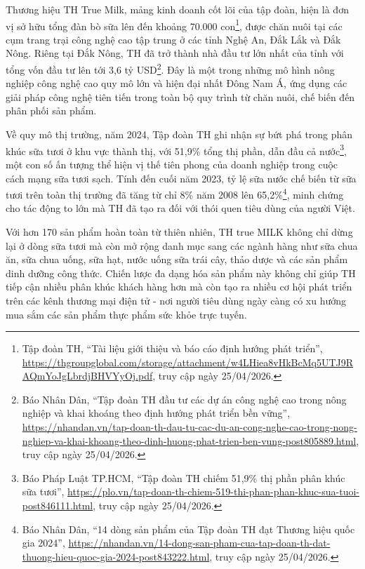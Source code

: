 Thương hiệu TH True Milk, mảng kinh doanh cốt lõi của tập đoàn, hiện là
đơn vị sở hữu tổng đàn bò sữa lên đến khoảng 70.000 con\footnote{Tập
  đoàn TH, ``Tài liệu giới thiệu và báo cáo định hướng phát triển'',
  \url{https://thgroupglobal.com/storage/attachment/w4LHiea8vHkBcMq5UTJ9RAQmYoJgLbrdjBHVYyOj.pdf},
  truy cập ngày 25/04/2026.}, được chăn nuôi tại các cụm trang trại công
nghệ cao tập trung ở các tỉnh Nghệ An, Đắk Lắk và Đắk Nông. Riêng tại
Đắk Nông, TH đã trở thành nhà đầu tư lớn nhất của tỉnh với tổng vốn đầu
tư lên tới 3,6 tỷ USD\footnote{Báo Nhân Dân, ``Tập đoàn TH đầu tư các dự
  án công nghệ cao trong nông nghiệp và khai khoáng theo định hướng phát
  triển bền vững'',
  \url{https://nhandan.vn/tap-doan-th-dau-tu-cac-du-an-cong-nghe-cao-trong-nong-nghiep-va-khai-khoang-theo-dinh-huong-phat-trien-ben-vung-post805889.html},
  truy cập ngày 25/04/2026.}. Đây là một trong những mô hình nông nghiệp
công nghệ cao quy mô lớn và hiện đại nhất Đông Nam Á, ứng dụng các giải
pháp công nghệ tiên tiến trong toàn bộ quy trình từ chăn nuôi, chế biến
đến phân phối sản phẩm.

Về quy mô thị trường, năm 2024, Tập đoàn TH ghi nhận sự bứt phá trong
phân khúc sữa tươi ở khu vực thành thị, với 51,9\% tổng thị phần, dẫn
đầu cả nước\footnote{Báo Pháp Luật TP.HCM, ``Tập đoàn TH chiếm 51,9\%
  thị phần phân khúc sữa tươi'',
  \url{https://plo.vn/tap-doan-th-chiem-519-thi-phan-phan-khuc-sua-tuoi-post846111.html},
  truy cập ngày 25/04/2026.}, một con số ấn tượng thể hiện vị thế tiên
phong của doanh nghiệp trong cuộc cách mạng sữa tươi sạch. Tính đến cuối
năm 2023, tỷ lệ sữa nước chế biến từ sữa tươi trên toàn thị trường đã
tăng từ chỉ 8\% năm 2008 lên 65,2\%\footnote{Báo Nhân Dân, ``14 dòng sản
  phẩm của Tập đoàn TH đạt Thương hiệu quốc gia 2024'',
  \url{https://nhandan.vn/14-dong-san-pham-cua-tap-doan-th-dat-thuong-hieu-quoc-gia-2024-post843222.html},
  truy cập ngày 25/04/2026.}, minh chứng cho tác động to lớn mà TH đã
tạo ra đối với thói quen tiêu dùng của người Việt.

Với hơn 170 sản phẩm hoàn toàn từ thiên nhiên, TH true MILK không chỉ
dừng lại ở dòng sữa tươi mà còn mở rộng danh mục sang các ngành hàng như
sữa chua ăn, sữa chua uống, sữa hạt, nước uống sữa trái cây, thảo dược
và các sản phẩm dinh dưỡng công thức. Chiến lược đa dạng hóa sản phẩm
này không chỉ giúp TH tiếp cận nhiều phân khúc khách hàng hơn mà còn tạo
ra nhiều cơ hội phát triển trên các kênh thương mại điện tử - nơi người
tiêu dùng ngày càng có xu hướng mua sắm các sản phẩm thực phẩm sức khỏe
trực tuyến.

